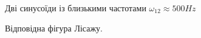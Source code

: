 \begin{figure}[h]
	\begin{minipage}[h]{0.47\linewidth}
		 Дві синусоїди із близькими частотами $\omega_{12} \approx 500 Hz$\\
	\end{minipage}
	\hfill
	\begin{minipage}[h]{0.47\linewidth}
		 Відповідна фігура Лісажу.\\

\end{minipage}
\end{figure}
